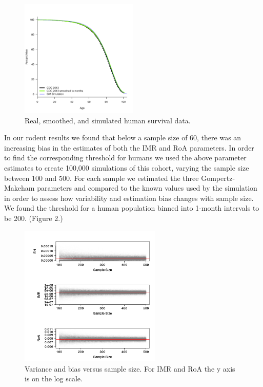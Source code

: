 \documentclass[review, authoryear]{elsarticle}
\begin{document}
\begin{figure}
\centering
\includegraphics[width=0.50000\textwidth]{pt2017_figure01.pdf}
\caption{Real, smoothed, and simulated human survival data.}
\end{figure}

In our rodent results \citep{bokov2017riskmodels} we found that below a
sample size of 60, there was an increasing bias in the estimates of both
the IMR and RoA parameters. In order to find the corresponding threshold
for humans we used the above parameter estimates to create 100,000
simulations of this cohort, varying the sample size between 100 and 500.
For each sample we estimated the three Gompertz-Makeham parameters and
compared to the known values used by the simulation in order to assess
how variability and estimation bias changes with sample size. We found
the threshold for a human population binned into 1-month intervals to be
200. (Figure 2.)

\begin{figure}
\centering
\includegraphics[width=0.60000\textwidth]{pt2017_figure02.png}
\caption{Variance and bias versus sample size. For IMR and RoA the y
axis is on the log scale.}
\end{figure}
\end{document}
